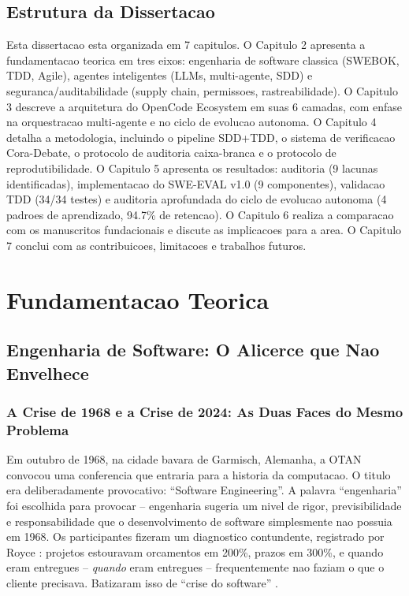 \documentclass[12pt,a4paper,oneside,sumario=tradicional,chapter=TITLE,section=TITLE,subsection=TITLE,english,brazil]{abntex2}
\begin{document}
\section{Estrutura da Dissertacao}

Esta dissertacao esta organizada em 7 capitulos. O Capitulo 2 apresenta a fundamentacao teorica em tres eixos: engenharia de software classica (SWEBOK, TDD, Agile), agentes inteligentes (LLMs, multi-agente, SDD) e seguranca/auditabilidade (supply chain, permissoes, rastreabilidade). O Capitulo 3 descreve a arquitetura do OpenCode Ecosystem em suas 6 camadas, com enfase na orquestracao multi-agente e no ciclo de evolucao autonoma. O Capitulo 4 detalha a metodologia, incluindo o pipeline SDD+TDD, o sistema de verificacao Cora-Debate, o protocolo de auditoria caixa-branca e o protocolo de reprodutibilidade. O Capitulo 5 apresenta os resultados: auditoria (9 lacunas identificadas), implementacao do SWE-EVAL v1.0 (9 componentes), validacao TDD (34/34 testes) e auditoria aprofundada do ciclo de evolucao autonoma (4 padroes de aprendizado, 94.7\% de retencao). O Capitulo 6 realiza a comparacao com os manuscritos fundacionais e discute as implicacoes para a area. O Capitulo 7 conclui com as contribuicoes, limitacoes e trabalhos futuros.

\cleardoublepage

\chapter{Fundamentacao Teorica}

\section{Engenharia de Software: O Alicerce que Nao Envelhece}

\subsection{A Crise de 1968 e a Crise de 2024: As Duas Faces do Mesmo Problema}

Em outubro de 1968, na cidade bavara de Garmisch, Alemanha, a OTAN convocou uma conferencia que entraria para a historia da computacao. O titulo era deliberadamente provocativo: ``Software Engineering''. A palavra ``engenharia'' foi escolhida para provocar -- engenharia sugeria um nivel de rigor, previsibilidade e responsabilidade que o desenvolvimento de software simplesmente nao possuia em 1968. Os participantes fizeram um diagnostico contundente, registrado por Royce \cite{royce1970managing}: projetos estouravam orcamentos em 200\%, prazos em 300\%, e quando eram entregues -- \textit{quando} eram entregues -- frequentemente nao faziam o que o cliente precisava. Batizaram isso de ``crise do software'' \cite{royce1970managing}.
\end{document}
